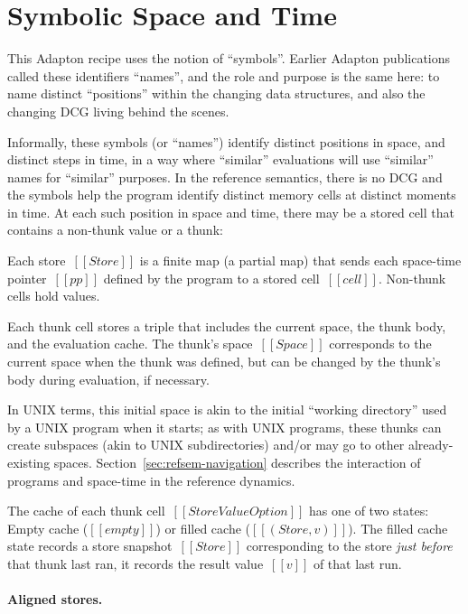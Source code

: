 \documentclass[11pt]{article}
\begin{document}
\section{Symbolic Space and Time}
\label{sec:symbolic-space-and-time}

This Adapton recipe uses the notion of ``symbols''.
%
Earlier Adapton publications called these identifiers ``names'', and
the role and purpose is the same here: to name distinct ``positions''
within the changing data structures, and also the changing DCG living
behind the scenes.

Informally, these symbols (or ``names'') identify distinct positions
in space, and distinct steps in time, in a way where ``similar''
evaluations will use ``similar'' names for ``similar'' purposes.
%
In the reference semantics, there is no DCG and the symbols help the
program identify distinct memory cells at distinct moments in time.
%
At each such position in space and time, there may be a stored cell
that contains a non-thunk value or a thunk:


\ottgrammartabular{\ottStore}
\ottgrammartabular{\ottcell}
\ottgrammartabular{\ottStoreValueOption}

Each store~$[[Store]]$ is a finite map (a partial map) that sends each space-time pointer~$[[pp]]$
defined by the program to a stored cell~$[[cell]]$.
%
Non-thunk cells hold values.

Each thunk cell stores a triple that includes the current space, the thunk body, and the evaluation cache.
%
The thunk's space~$[[Space]]$ corresponds to the current
space when the thunk was defined, but can be changed by the thunk's body during
evaluation, if necessary.

In UNIX terms, this initial space is akin to the initial ``working
directory'' used by a UNIX program when it starts; as with UNIX
programs, these thunks can create subspaces (akin to UNIX
subdirectories) and/or may go to other already-existing spaces.
%
Section~\ref{sec:refsem-navigation} describes the interaction of
programs and space-time in the reference dynamics.

The cache of each thunk cell~$[[StoreValueOption]]$ has one of two states:
Empty cache ($[[empty]]$) or
filled cache ($[[(Store, v)]]$).
%
The filled cache state records a store snapshot~$[[Store]]$
corresponding to the store \emph{just before} that thunk last ran,
it records the result value~$[[v]]$ of that last run.

\paragraph{Aligned stores.}
\end{document}
